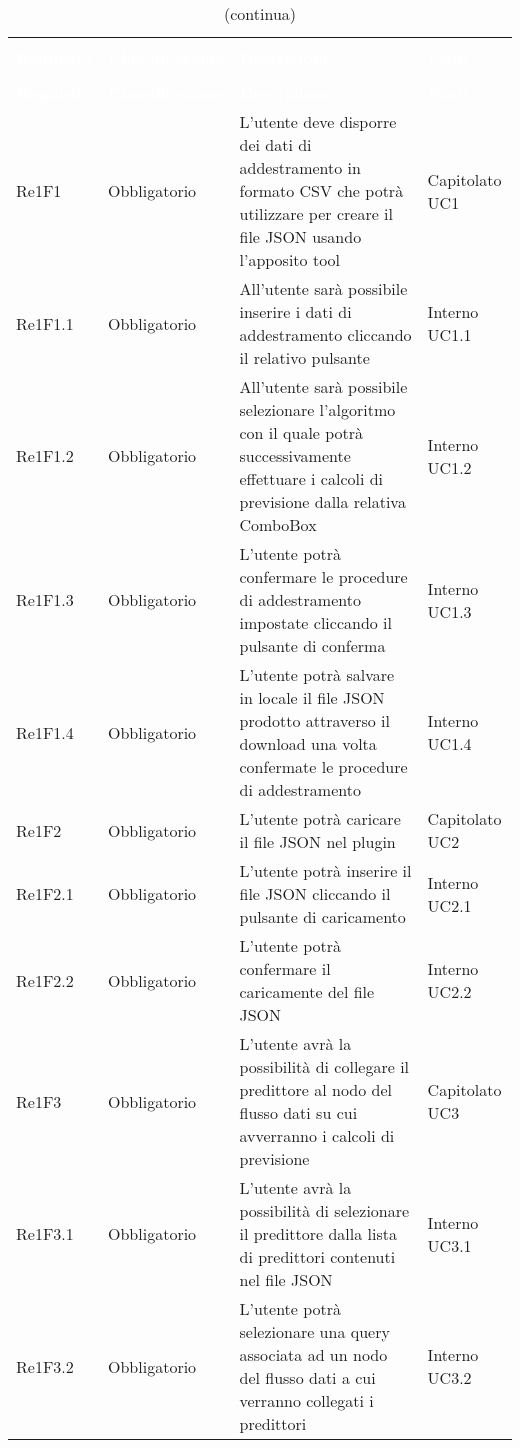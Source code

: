 \begin{longtable}{C{3cm} C{3cm} L{5.5cm} C{3cm}}
\caption{Tabella dei requisiti funzionali} \\
\textcolor{white}{\textbf{Requisito}} &
\textcolor{white}{\textbf{Classificazione}} &
\textcolor{white}{\textbf{Descrizione}} &
\textcolor{white}{\textbf{Fonti}}  \\
		\endfirsthead
		\caption[]{(continua)} \\
\textcolor{white}{\textbf{Requisito}} &
\textcolor{white}{\textbf{Classificazione}} &
\textcolor{white}{\textbf{Descrizione}} &
\textcolor{white}{\textbf{Fonti}}  \\
		\endhead
Re1F1 & Obbligatorio & L’utente deve disporre dei dati di addestramento in formato CSV che potrà utilizzare  per creare il file JSON usando l’apposito tool & Capitolato UC1\\
Re1F1.1 & Obbligatorio & All’utente sarà possibile inserire i dati di addestramento cliccando il relativo pulsante &  Interno UC1.1\\
Re1F1.2 & Obbligatorio & All’utente sarà possibile selezionare l’algoritmo con il quale potrà successivamente effettuare i calcoli di previsione dalla relativa ComboBox &  Interno UC1.2\\
Re1F1.3 & Obbligatorio & L’utente potrà confermare le procedure di addestramento impostate cliccando il pulsante di conferma &  Interno UC1.3\\
Re1F1.4 & Obbligatorio & L’utente potrà salvare in locale il file JSON prodotto attraverso il download una volta confermate le procedure di addestramento & Interno UC1.4\\
Re1F2 & Obbligatorio & L’utente potrà caricare il file JSON nel plugin & Capitolato UC2\\
Re1F2.1 & Obbligatorio & L’utente potrà inserire il file JSON cliccando il pulsante di caricamento &  Interno UC2.1\\
Re1F2.2 & Obbligatorio & L’utente potrà confermare il caricamente del file JSON &  Interno UC2.2\\
Re1F3 & Obbligatorio & L’utente avrà la possibilità di collegare il predittore al nodo del flusso dati su cui avverranno i calcoli di previsione &  Capitolato UC3\\
Re1F3.1 & Obbligatorio & L’utente avrà la possibilità di selezionare il predittore dalla lista di predittori contenuti nel file JSON&  Interno UC3.1\\
Re1F3.2 & Obbligatorio & L’utente potrà selezionare una query associata ad un nodo del flusso dati a cui verranno collegati i predittori &  Interno UC3.2\\

\end{longtable}
